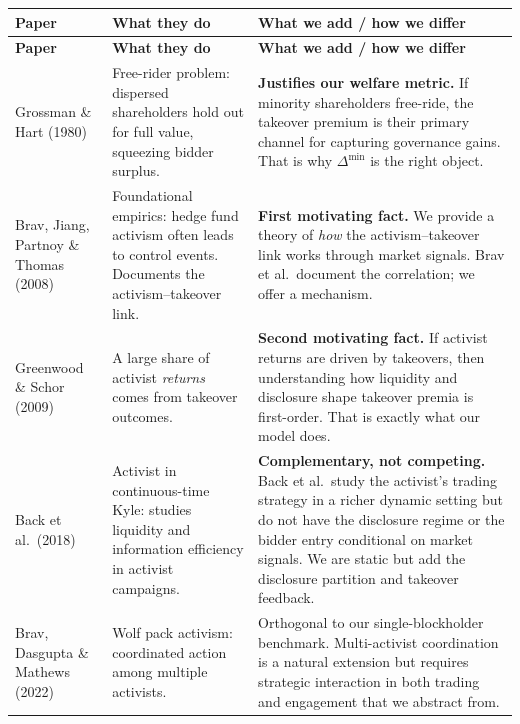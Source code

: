 \documentclass[9pt,a4paper]{extarticle}
\newcommand{\say}[1]{\textbf{#1}}
\begin{document}
{\footnotesize
\begin{longtable}{@{}P{0.20\textwidth}P{0.32\textwidth}P{0.42\textwidth}@{}}
\toprule
\textbf{Paper} & \textbf{What they do} & \textbf{What we add / how we differ} \\
\midrule
\endfirsthead
\toprule
\textbf{Paper} & \textbf{What they do} & \textbf{What we add / how we differ} \\
\midrule
\endhead

Grossman \& Hart (1980) &
Free-rider problem: dispersed shareholders hold out for full value, squeezing bidder surplus. &
\say{Justifies our welfare metric.} If minority shareholders free-ride, the takeover premium is their primary channel for capturing governance gains. That is why $\Delta^{\min}$ is the right object. \\

Brav, Jiang, Partnoy \& Thomas (2008) &
Foundational empirics: hedge fund activism often leads to control events. Documents the activism--takeover link. &
\say{First motivating fact.} We provide a theory of \emph{how} the activism--takeover link works through market signals. Brav et al.\ document the correlation; we offer a mechanism. \\

Greenwood \& Schor (2009) &
A large share of activist \emph{returns} comes from takeover outcomes. &
\say{Second motivating fact.} If activist returns are driven by takeovers, then understanding how liquidity and disclosure shape takeover premia is first-order. That is exactly what our model does. \\

Back et al.\ (2018) &
Activist in continuous-time Kyle: studies liquidity and information efficiency in activist campaigns. &
\say{Complementary, not competing.} Back et al.\ study the activist's trading strategy in a richer dynamic setting but do not have the disclosure regime or the bidder entry conditional on market signals. We are static but add the disclosure partition and takeover feedback. \\

Brav, Dasgupta \& Mathews (2022) &
Wolf pack activism: coordinated action among multiple activists. &
Orthogonal to our single-blockholder benchmark. Multi-activist coordination is a natural extension but requires strategic interaction in both trading and engagement that we abstract from. \\
\bottomrule
\end{longtable}
}
\end{document}
